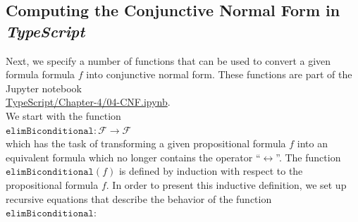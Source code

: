 \subsection{Computing the Conjunctive Normal Form in \textsl{TypeScript}}
Next, we specify a number of functions that can be used to convert a given formula
formula $f$ into conjunctive normal form.  These functions are part of the Jupyter notebook
\\[0.2cm]
\hspace*{1.3cm}
\href{https://github.com/karlstroetmann/Logic/blob/master/TypeScript/Chapter-4/04-CNF.ipynb}{TypeScript/Chapter-4/04-CNF.ipynb}.
\\[0.2cm]
We start with the
function 
\\[0.2cm]
\hspace*{1.3cm}
$\texttt{elimBiconditional}: \mathcal{F} \rightarrow \mathcal{F}$
\\[0.2cm]
which has the task of transforming a given propositional formula $f$ into an equivalent formula
which no longer contains the operator ``$\leftrightarrow$''.  The function
$\texttt{elimBiconditional}(f)$ is defined by induction with respect to the propositional formula $f$.
In order to present this inductive definition, we set up recursive equations
that describe the behavior of the function $\texttt{elimBiconditional}$:
